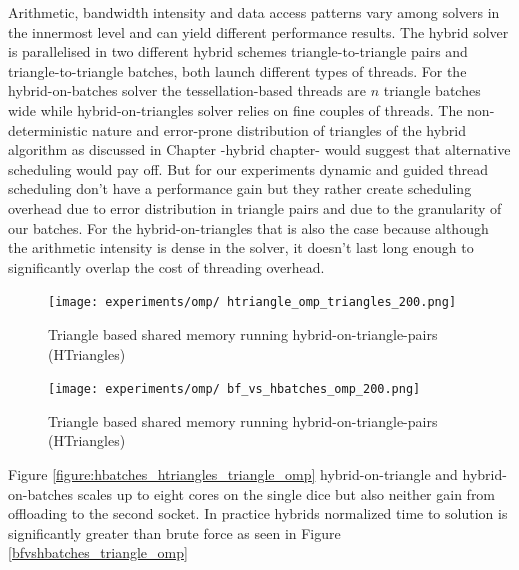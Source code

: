 Arithmetic, bandwidth intensity and data access patterns vary among solvers in the innermost level and can yield different performance results. The hybrid solver is parallelised in two different hybrid schemes triangle-to-triangle pairs and triangle-to-triangle batches, both launch different types of threads. For the hybrid-on-batches solver the tessellation-based threads
are $n$ triangle batches wide while hybrid-on-triangles solver relies on fine couples of threads. The non-deterministic nature and error-prone distribution of triangles of the hybrid algorithm as discussed in Chapter {-hybrid chapter-} would suggest that alternative scheduling would pay off. But for our experiments dynamic and guided thread scheduling don't have a performance gain but they rather create scheduling overhead due to error distribution in triangle pairs and due to the granularity of our batches. For the hybrid-on-triangles that is also the case because although the arithmetic intensity is dense in the solver, it doesn't last long enough to significantly overlap the cost of threading overhead. 

\begin{figure}[htb]
  \begin{center}
    \texttt{[image: experiments/omp/
htriangle\_omp\_triangles\_200.png]}
  \end{center}
  \caption{Triangle based shared memory running hybrid-on-triangle-pairs (HTriangles)}
  \label{figure:htriangles_triangles_triangle_omp}
\end{figure}


\begin{figure}[htb]
  \begin{center}
    \texttt{[image: experiments/omp/
bf\_vs\_hbatches\_omp\_200.png]}
  \end{center}
  \caption{Triangle based shared memory running hybrid-on-triangle-pairs (HTriangles)}
  \label{figure:bfvshbatches_triangle_omp}
\end{figure}

Figure \ref{figure:hbatches_htriangles_triangle_omp} hybrid-on-triangle and hybrid-on-batches scales up to eight cores on the single dice but also neither gain from offloading to the second socket. In practice hybrids normalized time to solution is significantly greater than brute force as seen in Figure \ref{bfvshbatches_triangle_omp}



